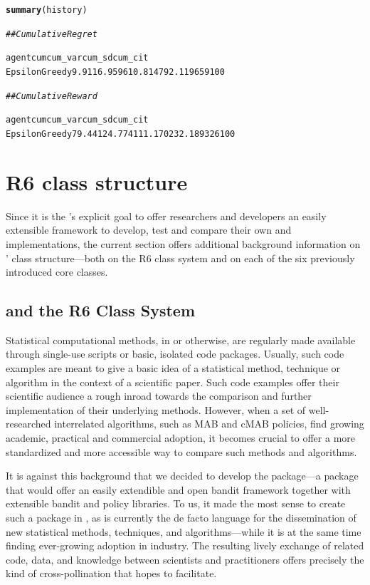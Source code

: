 \documentclass{jss}\usepackage[]{graphicx}\usepackage[]{color}
\makeatletter
\newcommand{\hlcom}[1]{\textcolor[rgb]{0.678,0.584,0.686}{\textit{#1}}}%
\newcommand{\hlkwd}[1]{\textcolor[rgb]{0.737,0.353,0.396}{\textbf{#1}}}%
\newenvironment{kframe}{%
 \def\at@end@of@kframe{}%
 \ifinner\ifhmode%
  \def\at@end@of@kframe{\end{minipage}}%
  \begin{minipage}{\columnwidth}%
 \fi\fi%
 \def\FrameCommand##1{\hskip\@totalleftmargin \hskip-\fboxsep
 \colorbox{shadecolor}{##1}\hskip-\fboxsep
     \hskip-\linewidth \hskip-\@totalleftmargin \hskip\columnwidth}%
 \MakeFramed {\advance\hsize-\width
   \@totalleftmargin\z@ \linewidth\hsize
   \@setminipage}}%
 {\par\unskip\endMakeFramed%
 \at@end@of@kframe}
\newenvironment{knitrout}{}{} %
\makeatother
\begin{document}
\begin{knitrout}\small
{}\color{fgcolor}\begin{kframe}
\begin{alltt}
\hlkwd{summary}(history)

\hlcom{## Cumulative Regret}

        agent   cum  cum_var   cum_sd   cum_ci   t
EpsilonGreedy   9.9 116.9596 10.81479 2.119659 100

\hlcom{## Cumulative Reward}

        agent   cum  cum_var   cum_sd   cum_ci   t
EpsilonGreedy 79.44 124.7741 11.17023 2.189326 100
\end{alltt}
\end{kframe}
\end{knitrout}

\section{R6 class structure}

Since it is the 's explicit goal to offer researchers and developers an easily extensible framework to develop, test and compare their own  and  implementations, the current section offers additional background information on ' class structure---both on the R6 class system and on each of the six previously introduced core  classes.

\subsection{ and the R6 Class System}

Statistical computational methods, in  or otherwise, are regularly made available through single-use scripts or basic, isolated code packages. Usually, such code examples are meant to give a basic idea of a statistical method, technique or algorithm in the context of a scientific paper.  Such code examples offer their scientific audience a rough inroad towards the comparison and further implementation of their underlying methods. However, when a set of well-researched interrelated algorithms, such as MAB and cMAB policies, find growing academic, practical and commercial adoption, it becomes crucial to offer a more standardized and more accessible way to compare such methods and algorithms.

It is against this background that we decided to develop the   package---a package that would offer an easily extendible and open bandit framework together with extensible bandit and policy libraries. To us, it made the most sense to create such a package in , as  is currently the de facto language for the dissemination of new statistical methods, techniques, and algorithms---while it is at the same time finding ever-growing adoption in industry. The resulting lively exchange of  related code, data, and knowledge between scientists and practitioners offers precisely the kind of cross-pollination that  hopes to facilitate.
\end{document}
